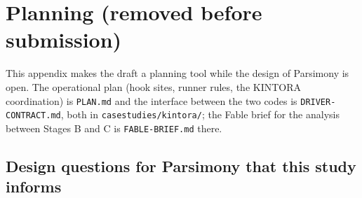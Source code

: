 \documentclass[11pt]{article}
\newif\ifplanning
\newcommand{\code}[1]{\texttt{#1}}
\begin{document}



\ifplanning
\clearpage
\appendix
\section{Planning (removed before submission)}
\label{app:plan}

This appendix makes the draft a planning tool while the design of Parsimony is open.  The
operational plan (hook sites, runner rules, the KINTORA coordination) is \code{PLAN.md} and
the interface between the two codes is \code{DRIVER-CONTRACT.md}, both in
\code{casestudies/kintora/}; the Fable brief for the analysis between Stages B and C is
\code{FABLE-BRIEF.md} there.

\subsection{Design questions for Parsimony that this study informs}
\end{document}
